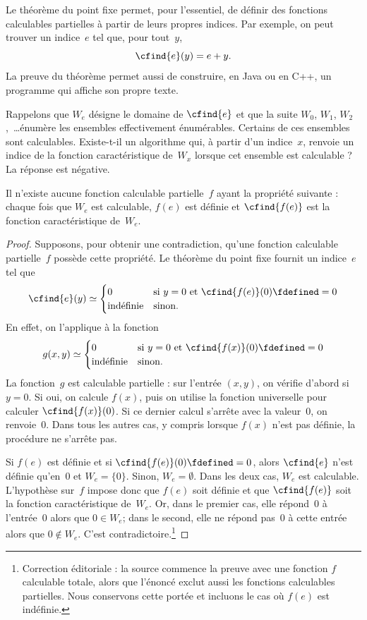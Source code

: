 \documentclass[../../../include/open-logic-section]{subfiles}
\begin{document}

Le théorème du point fixe permet, pour l'essentiel,
de définir des fonctions calculables partielles
à partir de leurs propres indices. Par exemple,
on peut trouver un indice~$e$ tel que, pour
tout~$y$,
\[
\cfind{e}(y) = e + y.
\]
La preuve du théorème permet aussi de construire,
en Java ou en C++, un programme qui affiche
son propre texte.

Rappelons que $W_e$ désigne le domaine de
$\cfind{e}$ et que la suite $W_0$, $W_1$,
$W_2$,~\dots énumère les ensembles effectivement
énumérables. Certains de ces ensembles sont
calculables. Existe-t-il un algorithme qui,
à partir d'un indice~$x$, renvoie un indice
de la fonction caractéristique de~$W_x$
lorsque cet ensemble est calculable ?
La réponse est négative.

\begin{thm}
Il n'existe aucune fonction calculable partielle~$f$
ayant la propriété suivante : chaque fois que
$W_e$ est calculable, $f(e)$ est définie et
$\cfind{f(e)}$ est la fonction caractéristique
de~$W_e$.
\end{thm}

\begin{proof}
Supposons, pour obtenir une contradiction, qu'une
fonction calculable partielle~$f$ possède cette
propriété. Le théorème du point fixe fournit un
indice~$e$ tel que
\[
\cfind{e}(y) \simeq
\begin{cases}
0 & \text{si $y=0$ et $\cfind{f(e)}(0) \fdefined = 0$} \\
\text{indéfinie} & \text{sinon.}
\end{cases}
\]
En effet, on l'applique à la fonction
\[
g(x,y) \simeq
\begin{cases}
0 & \text{si $y=0$ et $\cfind{f(x)}(0) \fdefined = 0$} \\
\text{indéfinie} & \text{sinon.}
\end{cases}
\]
La fonction~$g$ est calculable partielle :
sur l'entrée $(x,y)$, on vérifie d'abord si
$y=0$. Si oui, on calcule $f(x)$, puis on
utilise la fonction universelle pour calculer
$\cfind{f(x)}(0)$. Si ce dernier calcul
s'arrête avec la valeur~$0$, on renvoie~$0$.
Dans tous les autres cas, y compris lorsque
$f(x)$ n'est pas définie, la procédure ne
s'arrête pas.

Si $f(e)$ est définie et si
$\cfind{f(e)}(0)\fdefined=0$, alors
$\cfind{e}$ n'est définie qu'en~$0$ et
$W_e=\{0\}$. Sinon, $W_e=\emptyset$.
Dans les deux cas, $W_e$ est calculable.
L'hypothèse sur~$f$ impose donc que $f(e)$
soit définie et que $\cfind{f(e)}$ soit la
fonction caractéristique de~$W_e$. Or, dans
le premier cas, elle répond~$0$ à l'entrée~$0$
alors que $0\in W_e$; dans le second, elle ne
répond pas~$0$ à cette entrée alors que
$0\notin W_e$. C'est contradictoire.\footnote{Correction éditoriale : la source commence la preuve avec une fonction $f$ calculable totale, alors que l'énoncé exclut aussi les fonctions calculables partielles. Nous conservons cette portée et incluons le cas où $f(e)$ est indéfinie.}
\end{proof}
\end{document}
